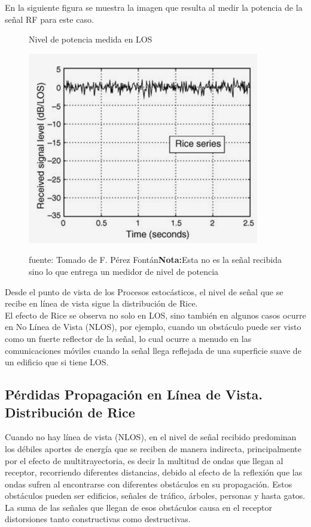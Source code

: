 En la siguiente figura se muestra la imagen que resulta al medir la potencia de la señal RF para este caso. \\
\begin{figure}[h!]
	\captionsetup{justification = raggedright, singlelinecheck = false}
	\caption{Nivel de potencia medida en LOS} 
	\centering
	\includegraphics[scale=1]{Imagenes/Medidor.png}
	\label{fig:Medidor}
		\caption*{fuente: Tomado de F. Pérez Fontán\textbf{Nota:}Esta no es la señal recibida sino lo que entrega un medidor de nivel de potencia} 
\end{figure}

Desde el punto de vista de los Procesos estocásticos, el nivel de señal que se recibe en línea de vista sigue la distribución de Rice.\\

El efecto de Rice se observa no solo en LOS, sino también en algunos casos ocurre en No Línea de Vista (NLOS), por ejemplo, cuando un obstáculo puede ser visto como un fuerte reflector de la señal, lo cual ocurre a menudo en las comunicaciones móviles cuando la señal llega reflejada de una superficie suave de un edificio que si tiene LOS. \\

\subsection{Pérdidas Propagación en Línea de Vista. Distribución de Rice}

Cuando no hay línea de vista (NLOS), en el nivel de señal recibido predominan los débiles aportes de energía que se reciben de manera indirecta, principalmente por el efecto de multitrayectoria, es decir la multitud de ondas que llegan al receptor, recorriendo diferentes distancias, debido al efecto de la reflexión que las  ondas sufren al encontrarse con diferentes obstáculos en su propagación. Estos obstáculos pueden ser edificios, señales de tráfico, árboles, personas y hasta gatos. La suma de las señales que llegan de esos obstáculos causa en el receptor distorsiones tanto constructivas como destructivas. \\


